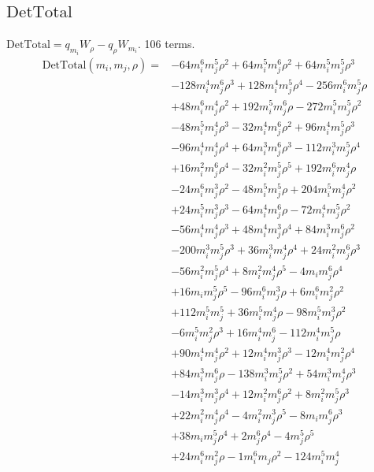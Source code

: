 \subsection*{$\mathrm{DetTotal}$}
$\mathrm{DetTotal}=q_{m_i}W_\rho-q_\rho W_{m_i}$. 106 terms.
{\small
\begin{align*}
\mathrm{DetTotal}(m_i,m_j,\rho)={}&-64m_i^{6}m_j^{5}\rho^{2}+64m_i^{5}m_j^{6}\rho^{2}+64m_i^{5}m_j^{5}\rho^{3}\\
&-128m_i^{4}m_j^{6}\rho^{3}+128m_i^{4}m_j^{5}\rho^{4}-256m_i^{6}m_j^{5}\rho\\
&+48m_i^{6}m_j^{4}\rho^{2}+192m_i^{5}m_j^{6}\rho-272m_i^{5}m_j^{5}\rho^{2}\\
&-48m_i^{5}m_j^{4}\rho^{3}-32m_i^{4}m_j^{6}\rho^{2}+96m_i^{4}m_j^{5}\rho^{3}\\
&-96m_i^{4}m_j^{4}\rho^{4}+64m_i^{3}m_j^{6}\rho^{3}-112m_i^{3}m_j^{5}\rho^{4}\\
&+16m_i^{2}m_j^{6}\rho^{4}-32m_i^{2}m_j^{5}\rho^{5}+192m_i^{6}m_j^{4}\rho\\
&-24m_i^{6}m_j^{3}\rho^{2}-48m_i^{5}m_j^{5}\rho+204m_i^{5}m_j^{4}\rho^{2}\\
&+24m_i^{5}m_j^{3}\rho^{3}-64m_i^{4}m_j^{6}\rho-72m_i^{4}m_j^{5}\rho^{2}\\
&-56m_i^{4}m_j^{4}\rho^{3}+48m_i^{4}m_j^{3}\rho^{4}+84m_i^{3}m_j^{6}\rho^{2}\\
&-200m_i^{3}m_j^{5}\rho^{3}+36m_i^{3}m_j^{4}\rho^{4}+24m_i^{2}m_j^{6}\rho^{3}\\
&-56m_i^{2}m_j^{5}\rho^{4}+8m_i^{2}m_j^{4}\rho^{5}-4m_im_j^{6}\rho^{4}\\
&+16m_im_j^{5}\rho^{5}-96m_i^{6}m_j^{3}\rho+6m_i^{6}m_j^{2}\rho^{2}\\
&+112m_i^{5}m_j^{5}+36m_i^{5}m_j^{4}\rho-98m_i^{5}m_j^{3}\rho^{2}\\
&-6m_i^{5}m_j^{2}\rho^{3}+16m_i^{4}m_j^{6}-112m_i^{4}m_j^{5}\rho\\
&+90m_i^{4}m_j^{4}\rho^{2}+12m_i^{4}m_j^{3}\rho^{3}-12m_i^{4}m_j^{2}\rho^{4}\\
&+84m_i^{3}m_j^{6}\rho-138m_i^{3}m_j^{5}\rho^{2}+54m_i^{3}m_j^{4}\rho^{3}\\
&-14m_i^{3}m_j^{3}\rho^{4}+12m_i^{2}m_j^{6}\rho^{2}+8m_i^{2}m_j^{5}\rho^{3}\\
&+22m_i^{2}m_j^{4}\rho^{4}-4m_i^{2}m_j^{3}\rho^{5}-8m_im_j^{6}\rho^{3}\\
&+38m_im_j^{5}\rho^{4}+2m_j^{6}\rho^{4}-4m_j^{5}\rho^{5}\\
&+24m_i^{6}m_j^{2}\rho-1m_i^{6}m_j\rho^{2}-124m_i^{5}m_j^{4}\\

\end{align*}}
